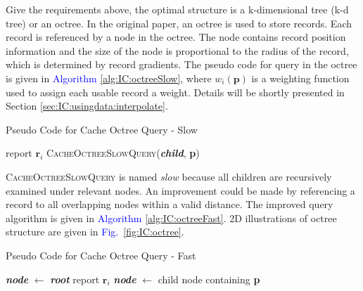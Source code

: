 \documentclass[]{book}
\renewcommand{\figurename}{\textcolor{blue}{Fig.\ }}
\begin{document}
Give the requirements above, the optimal structure is a k-dimensional tree (k-d tree) or an octree.
In the original paper, an octree is used to store records.
Each record is referenced by a node in the octree.
The node contains record position information and the size of the node is proportional to the radius of the record, which is determined by record gradients.
The pseudo code for query in the octree is given in \textcolor{blue}{Algorithm \ref{alg:IC:octreeSlow}}, where $w_i(\textbf{p})$ is a weighting function used to assign each usable record a weight.
Details will be shortly presented in Section \ref{sec:IC:usingdata:interpolate}.

\begin{algorithm}[!ht]
\caption[Slow Octree Query]{Pseudo Code for Cache Octree Query - Slow}
\label{alg:IC:octreeSlow}
\begin{algorithmic}[1]
			\State report $\textbf{r}_i$
		\EndIf
	\EndFor
			\State \textsc{CacheOctreeSlowQuery}(\textbf{\textit{child}}, \textbf{p})
		\EndIf
	\EndFor
\EndProcedure
\end{algorithmic}
\end{algorithm}

\textsc{CacheOctreeSlowQuery} is named \textit{slow} because all children are recursively examined under relevant nodes.
An improvement could be made by referencing a record to all overlapping nodes within a valid distance.
The improved query algorithm is given in \textcolor{blue}{Algorithm \ref{alg:IC:octreeFast}}.
2D illustrations of octree structure are given in \figurename \ref{fig:IC:octree}.

\begin{algorithm}[!ht]
\caption[Fast Octree Query]{Pseudo Code for Cache Octree Query - Fast}
\label{alg:IC:octreeFast}
\begin{algorithmic}[1]
		\State \textbf{\textit{node}} $\gets$ \textbf{\textit{root}}
					\State report $\textbf{r}_i$
				\EndIf
			\EndFor
			\State \textbf{\textit{node}} $\gets$ child node containing \textbf{p}
		\EndWhile
	\EndProcedure
\end{algorithmic}
\end{algorithm}
\end{document}
